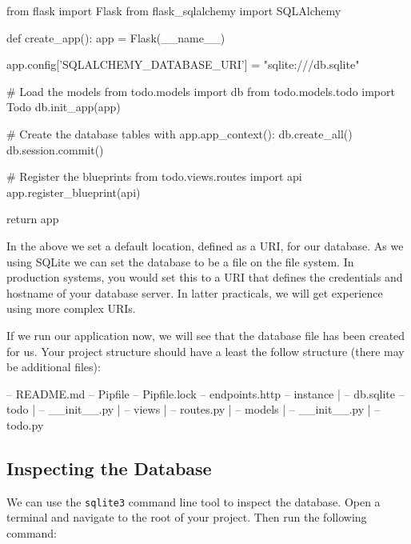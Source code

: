 \documentclass{csse4400}
\begin{document}
\begin{code}[language=python,numbers=none]{}
from flask import Flask
from flask_sqlalchemy import SQLAlchemy

def create_app():
    app = Flask(__name__)

    app.config['SQLALCHEMY_DATABASE_URI'] = "sqlite:///db.sqlite"

    # Load the models
    from todo.models import db
    from todo.models.todo import Todo
    db.init_app(app)

    # Create the database tables
    with app.app_context():
        db.create_all()
        db.session.commit()

    # Register the blueprints
    from todo.views.routes import api
    app.register_blueprint(api)

    return app
\end{code}

In the above we set a default location, defined as a URI, for our database.
As we using SQLite we can set the database to be a file on the file system.
In production systems, you would set this to a URI that defines the credentials and hostname of your database server.
In latter practicals, we will get experience using more complex URIs.

If we run our application now, we will see that the database file has been created for us.
Your project structure should have a least the follow structure (there may be additional files):

\begin{code}[language=bash,numbers=none]{}
-- README.md
-- Pipfile
-- Pipfile.lock
-- endpoints.http
-- instance
  | -- db.sqlite
-- todo
  | -- __init__.py
  | -- views
      | -- routes.py
  | -- models
      | -- __init__.py
      | -- todo.py
\end{code}

\subsection{Inspecting the Database}

We can use the \texttt{sqlite3} command line tool to inspect the database.
Open a terminal and navigate to the root of your project.
Then run the following command:


\end{document}
